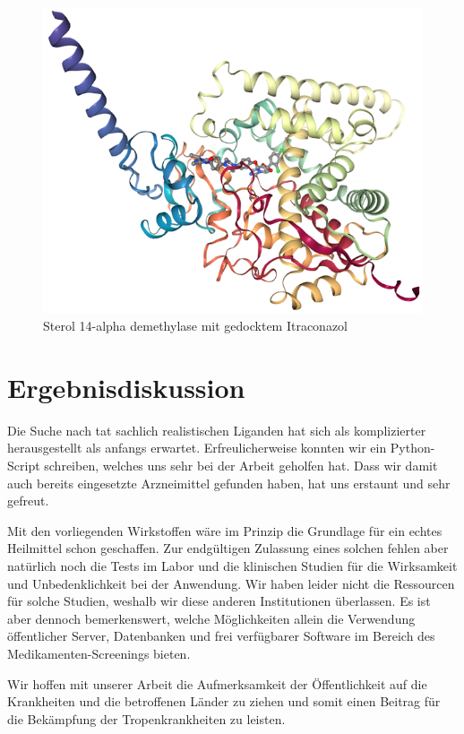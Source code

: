 \documentclass[10pt]{article}
\begin{document}
    \begin{figure}[H]
        \centering
        \includegraphics[width=0.6\linewidth]{Sterol 14-alpha demethylase mit gedocktem Itraconazol}
        \caption{Sterol 14-alpha demethylase mit gedocktem Itraconazol}\label{fig:figure-sterol-Itraconazol}
    \end{figure}


    \section{Ergebnisdiskussion}\label{sec:ergebnisdiskussion}
    Die Suche nach tat sachlich realistischen Liganden hat sich als komplizierter herausgestellt als anfangs erwartet.
    Erfreulicherweise konnten wir ein Python-Script schreiben, welches uns sehr bei der Arbeit geholfen hat. Dass wir
    damit auch bereits eingesetzte Arzneimittel gefunden haben, hat uns erstaunt und sehr gefreut.

    Mit den vorliegenden Wirkstoffen wäre im Prinzip die Grundlage für ein echtes Heilmittel schon geschaffen. Zur
    endgültigen Zulassung eines solchen fehlen aber natürlich noch die Tests im Labor und die klinischen Studien für
    die Wirksamkeit und Unbedenklichkeit bei der Anwendung.
    Wir haben leider nicht die Ressourcen für solche Studien,
    weshalb wir diese anderen Institutionen überlassen.
    Es ist aber dennoch bemerkenswert, welche Möglichkeiten
    allein die Verwendung öffentlicher Server, Datenbanken und frei verfügbarer Software im Bereich des
    Medikamenten-Screenings bieten.

    Wir hoffen mit unserer Arbeit die Aufmerksamkeit der Öffentlichkeit auf die Krankheiten und die betroffenen
    Länder zu ziehen und somit einen Beitrag für die Bekämpfung der Tropenkrankheiten zu leisten.
\end{document}
